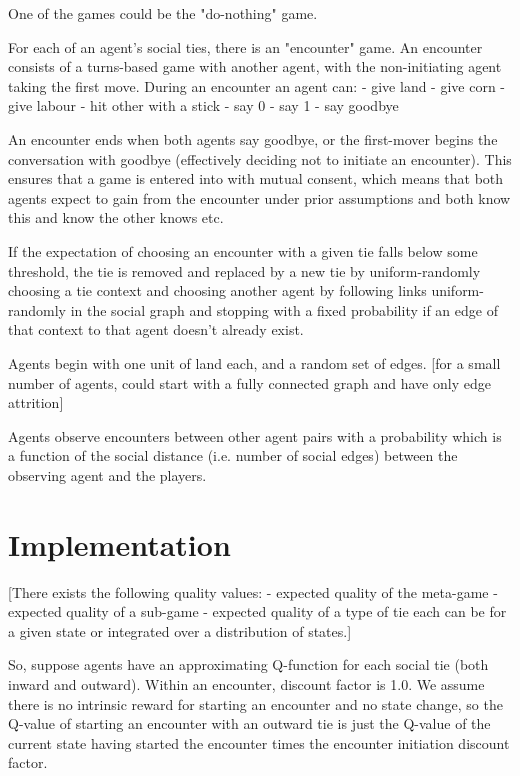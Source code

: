 \documentclass[a4paper]{report}
\begin{document}
One of the games could be the "do-nothing" game.

For each of an agent's social ties, there is an "encounter" game. An encounter consists of a turns-based game with another agent, with the non-initiating agent taking the first move. During an encounter an agent can:
- give land
- give corn
- give labour
- hit other with a stick
- say 0
- say 1
- say goodbye

An encounter ends when both agents say goodbye, or the first-mover begins the conversation with goodbye (effectively deciding not to initiate an encounter). This ensures that a game is entered into with mutual consent, which means that both agents expect to gain from the encounter under prior assumptions and both know this and know the other knows etc.

If the expectation of choosing an encounter with a given tie falls below some threshold, the tie is removed and replaced by a new tie by uniform-randomly choosing a tie context and choosing another agent by following links uniform-randomly in the social graph and stopping with a fixed probability if an edge of that context to that agent doesn't already exist.

Agents begin with one unit of land each, and a random set of edges. [for a small number of agents, could start with a fully connected graph and have only edge attrition]

Agents observe encounters between other agent pairs with a probability which is a function of the social distance (i.e. number of social edges) between the observing agent and the players.

\section{Implementation}

[There exists the following quality values:
- expected quality of the meta-game
- expected quality of a sub-game
- expected quality of a type of tie
each can be for a given state or integrated over a distribution of states.]

So, suppose agents have an approximating Q-function for each social tie (both inward and outward). Within an encounter, discount factor is 1.0. We assume there is no intrinsic reward for starting an encounter and no state change, so the Q-value of starting an encounter with an outward tie is just the Q-value of the current state having started the encounter times the encounter initiation discount factor.
\end{document}
